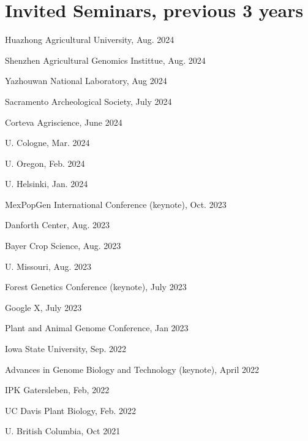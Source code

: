 \documentclass[letterpaper,10pt]{article}
\renewenvironment{itemize}{
  \begin{list}{}{
    \setlength{\leftmargin}{1.5em}
  }
}{
  \end{list}
}
\begin{document}
\section*{Invited Seminars, previous 3 years}
\begin{itemize}
\setlength\itemsep{0ex}
\item Huazhong Agricultural University, Aug. 2024
\item Shenzhen Agricultural Genomics Instittue, Aug. 2024
\item Yazhouwan National Laboratory, Aug 2024
\item Sacramento Archeological Society, July 2024
\item Corteva Agriscience, June 2024
\item U. Cologne, Mar. 2024
\item U. Oregon, Feb. 2024
\item U. Helsinki, Jan. 2024
\item MexPopGen International Conference (keynote), Oct. 2023
\item Danforth Center, Aug. 2023
\item Bayer Crop Science, Aug. 2023
\item U. Missouri, Aug. 2023
\item Forest Genetics Conference (keynote), July 2023
\item Google X, July 2023
\item Plant and Animal Genome Conference, Jan 2023
\item Iowa State University, Sep. 2022
\item Advances in Genome Biology and Technology (keynote), April 2022
\item IPK Gatersleben, Feb, 2022
\item UC Davis Plant Biology, Feb. 2022
\item U. British Columbia, Oct 2021

\end{itemize}
\end{document}

